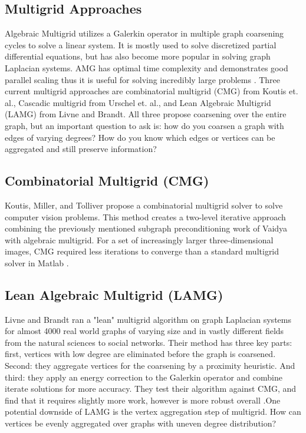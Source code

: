 \documentclass{article}
\begin{document}
\subsection{Multigrid Approaches}
Algebraic Multigrid utilizes a Galerkin operator in multiple graph coarsening cycles to solve a linear system. It is mostly used to solve discretized partial differential equations, but has also become more popular in solving graph Laplacian systems. AMG has optimal time complexity and demonstrates good parallel scaling thus it is useful for solving incredibly large problems \cite{Livne:2012}. Three current multigrid approaches are combinatorial multigrid (CMG) from Koutis et. al., Cascadic multigrid from Urschel et. al., and Lean Algebraic Multigrid (LAMG) from Livne and Brandt. All three propose coarsening over the entire graph, but an important question to ask is: how do you coarsen a graph with edges of varying degrees? How do you know which edges or vertices can be aggregated and still preserve information?


\subsection{Combinatorial Multigrid (CMG)}
Koutis, Miller, and Tolliver propose a combinatorial multigrid solver to solve computer vision problems. This method creates a two-level iterative approach combining the previously mentioned subgraph preconditioning work of Vaidya with algebraic multigrid. For a set of increasingly larger three-dimensional images, CMG required less iterations to converge than a standard multigrid solver in Matlab \cite{Koutis:2011}.

\subsection{Lean Algebraic Multigrid (LAMG)}
Livne and Brandt ran a "lean" multigrid algorithm on graph Laplacian systems for almost 4000 real world graphs of varying size and in vastly different fields from the natural sciences to social networks. Their method has three key parts: first, vertices with low degree are eliminated before the graph is coarsened. Second: they aggregate vertices for the coarsening by a proximity heuristic. And third: they apply an energy correction to the Galerkin operator and combine iterate solutions for more accuracy. They test their algorithm against CMG, and find that it requires slightly more work, however is more robust overall \cite{Livne:2012}.One potential downside of LAMG is the vertex aggregation step of multigrid. How can vertices be evenly aggregated over graphs with uneven degree distribution?
\end{document}
